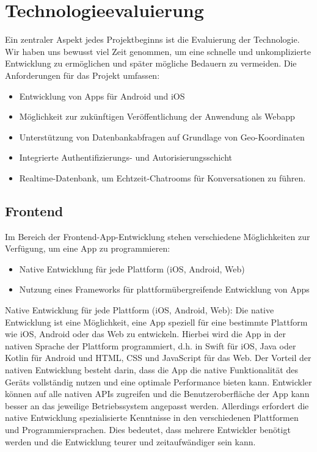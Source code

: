 \section{Technologieevaluierung}

Ein zentraler Aspekt jedes Projektbeginns ist die Evaluierung der Technologie. Wir haben uns bewusst viel Zeit genommen, um eine schnelle und unkomplizierte Entwicklung zu ermöglichen und später mögliche Bedauern zu vermeiden. Die Anforderungen für das Projekt umfassen:

\begin{itemize}
    \item Entwicklung von Apps für Android und iOS
    \item Möglichkeit zur zukünftigen Veröffentlichung der Anwendung als Webapp
    \item Unterstützung von Datenbankabfragen auf Grundlage von Geo-Koordinaten
    \item Integrierte Authentifizierungs- und Autorisierungsschicht
    \item Realtime-Datenbank, um Echtzeit-Chatrooms für Konversationen zu führen.
\end{itemize}

\subsection{Frontend}

Im Bereich der Frontend-App-Entwicklung stehen verschiedene Möglichkeiten zur Verfügung, um eine App zu programmieren:
\begin{itemize}
    \item Native Entwicklung für jede Plattform (iOS, Android, Web)
    \item Nutzung eines Frameworks für plattformübergreifende Entwicklung von Apps
\end{itemize}

Native Entwicklung für jede Plattform (iOS, Android, Web):
Die native Entwicklung ist eine Möglichkeit, eine App speziell für eine bestimmte Plattform wie iOS, Android oder das Web zu entwickeln. Hierbei wird die App in der nativen Sprache der Plattform programmiert, d.h. in Swift für iOS, Java oder Kotlin für Android und HTML, CSS und JavaScript für das Web. Der Vorteil der nativen Entwicklung besteht darin, dass die App die native Funktionalität des Geräts vollständig nutzen und eine optimale Performance bieten kann. Entwickler können auf alle nativen APIs zugreifen und die Benutzeroberfläche der App kann besser an das jeweilige Betriebssystem angepasst werden. Allerdings erfordert die native Entwicklung spezialisierte Kenntnisse in den verschiedenen Plattformen und Programmiersprachen. Dies bedeutet, dass mehrere Entwickler benötigt werden und die Entwicklung teurer und zeitaufwändiger sein kann.

